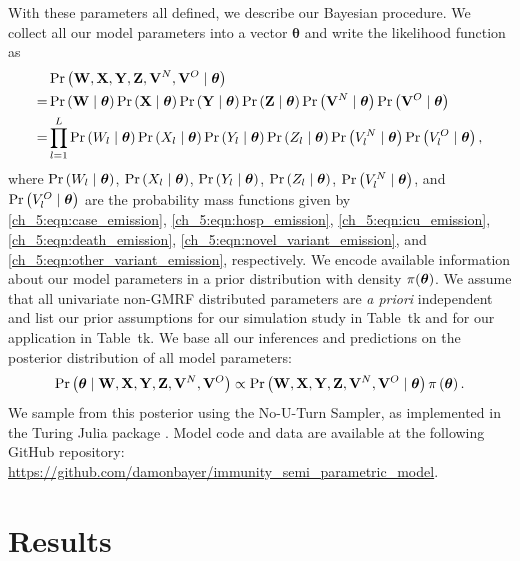 With these parameters all defined, we describe our Bayesian procedure.
We collect all our model parameters into a vector $\boldsymbol{\theta}$ and write the likelihood function as 
\begin{align*}
& \operatorname{Pr}\left(\mathbf{W}, \mathbf{X}, \mathbf{Y}, \mathbf{Z}, \mathbf{V}^N, \mathbf{V}^O \mid \boldsymbol{\theta} \right) \\
=& \operatorname{Pr}\left(\mathbf{W} \mid \boldsymbol{\theta} \right) \operatorname{Pr}\left(\mathbf{X} \mid \boldsymbol{\theta} \right) \operatorname{Pr}\left(\mathbf{Y} \mid \boldsymbol{\theta} \right) \operatorname{Pr}\left(\mathbf{Z} \mid \boldsymbol{\theta} \right) \operatorname{Pr}\left(\mathbf{V}^N \mid \boldsymbol{\theta} \right) \operatorname{Pr}\left(\mathbf{V}^O \mid \boldsymbol{\theta} \right)    \\
=&   \prod_{l=1}^{L} \operatorname{Pr}\left(W_l \mid \boldsymbol{\theta} \right) \operatorname{Pr}\left(X_l \mid \boldsymbol{\theta} \right) \operatorname{Pr}\left(Y_l \mid \boldsymbol{\theta} \right) \operatorname{Pr}\left(Z_l \mid \boldsymbol{\theta} \right) \operatorname{Pr}\left(V^N_l \mid \boldsymbol{\theta} \right) \operatorname{Pr}\left(V^O_l \mid \boldsymbol{\theta} \right),
\end{align*}
where \( \operatorname{Pr}\left(W_l \mid \boldsymbol{\theta} \right) \), \( \operatorname{Pr}\left(X_l \mid \boldsymbol{\theta} \right) \), \( \operatorname{Pr}\left(Y_l \mid \boldsymbol{\theta} \right) \), \( \operatorname{Pr}\left(Z_l \mid \boldsymbol{\theta} \right) \), \( \operatorname{Pr}\left(V^N_l \mid \boldsymbol{\theta} \right) \), and \( \operatorname{Pr}\left(V^O_l \mid \boldsymbol{\theta} \right)  \) are the probability mass functions given by \eqref{ch_5:eqn:case_emission}, \eqref{ch_5:eqn:hosp_emission}, \eqref{ch_5:eqn:icu_emission}, \eqref{ch_5:eqn:death_emission}, \eqref{ch_5:eqn:novel_variant_emission}, and \eqref{ch_5:eqn:other_variant_emission}, respectively.
We encode available information about our model parameters in a prior distribution with density $\pi(\boldsymbol{\theta})$.
We assume that all univariate non-GMRF distributed parameters are \textit{a priori} independent and list our prior assumptions for our simulation study in Table~tk and for our application in Table~tk.
We base all our inferences and predictions on the posterior distribution of all model parameters:
\begin{equation}
\operatorname{Pr}\left(\boldsymbol{\theta} \mid \mathbf{W}, \mathbf{X}, \mathbf{Y}, \mathbf{Z}, \mathbf{V}^N, \mathbf{V}^O \right) \propto \operatorname{Pr}\left(\mathbf{W}, \mathbf{X}, \mathbf{Y}, \mathbf{Z}, \mathbf{V}^N, \mathbf{V}^O \mid \boldsymbol{\theta} \right) \pi \left( \boldsymbol{\theta} \right).
\end{equation}
We sample from this posterior using the No-U-Turn Sampler, \citep{NUTS} as implemented in the Turing Julia package \citep{turing}.
Model code and data are available at the following GitHub repository: \url{https://github.com/damonbayer/immunity_semi_parametric_model}.

\section{Results}
\label{ch_5:sec:results}

